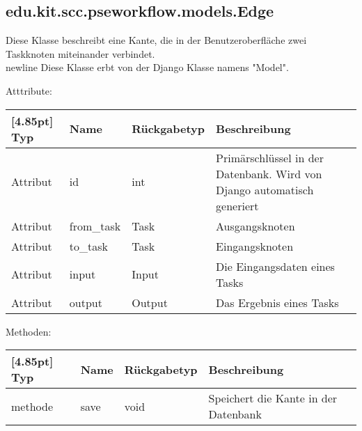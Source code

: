         \subsection{edu.kit.scc.pseworkflow.models.Edge}	
    			Diese Klasse beschreibt eine Kante, die in der Benutzeroberfläche zwei Taskknoten miteinander verbindet. \\newline
    			Diese Klasse erbt von der Django Klasse namens "Model".
    			
    			Atttribute:
    			\begin{center}
    				\setlength\tabcolsep{5pt}
    				\renewcommand{\arraystretch}{1.5}
    				
    				\begin{tabularx}{\textwidth}{|l|l|l|X|}
    					\hline
    					\rowcolor[gray]{0.75}[4.85pt]
    					Typ & Name & Rückgabetyp & Beschreibung \\ \hline 
    	           		Attribut & id & int & Primärschlüssel in der Datenbank. Wird von Django automatisch generiert \\ \hline
    	           		Attribut & from\_task & Task & Ausgangsknoten \\ \hline
    	           		Attribut & to\_task & Task & Eingangsknoten \\ \hline
    	           		Attribut & input & Input & Die Eingangsdaten eines Tasks\\ \hline
    	           		Attribut & output & Output & Das Ergebnis eines Tasks \\
    	           		
    	           		\hline
    				\end{tabularx}
    			\end{center}
    			
    			Methoden:
    			\begin{center}
    				\setlength\tabcolsep{5pt}
    				\renewcommand{\arraystretch}{1.5}
    				
    				\begin{tabularx}{\textwidth}{|l|l|l|X|}
    					\hline
    					\rowcolor[gray]{0.75}[4.85pt]
    					Typ & Name & Rückgabetyp & Beschreibung \\ \hline
    					methode& save & void & Speichert die Kante in der Datenbank\\ 
    					\hline
    				\end{tabularx}
    			\end{center}
    			
    			
    

